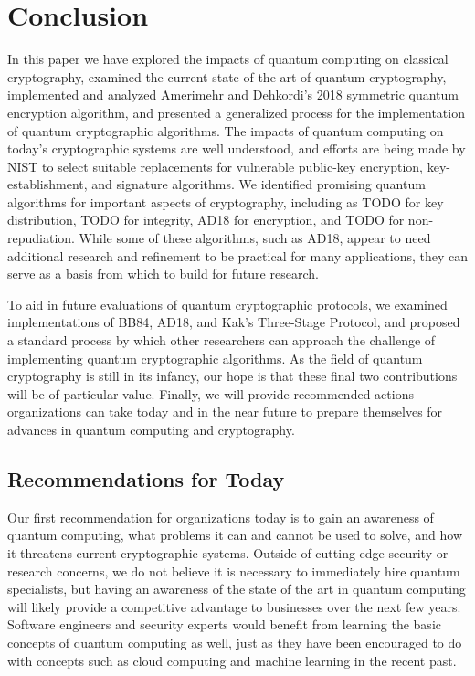 \documentclass[sigconf]{acmart}
\begin{document}
\section{Conclusion}
In this paper we have explored the impacts of quantum computing on classical cryptography, examined the current state of the art of quantum cryptography, implemented and analyzed Amerimehr and Dehkordi's 2018 symmetric quantum encryption algorithm\cite{amerimehr_quantum_2018}, and presented a generalized process for the implementation of quantum cryptographic algorithms. The impacts of quantum computing on today's cryptographic systems are well understood, and efforts are being made by NIST to select suitable replacements for vulnerable public-key encryption, key-establishment, and signature algorithms\cite{moody_nist_2020, csd_postquantum_2017}. We identified promising quantum algorithms for important aspects of cryptography, including as TODO for key distribution, TODO for integrity, AD18 for encryption, and TODO for non-repudiation. While some of these algorithms, such as AD18, appear to need additional research and refinement to be practical for many applications, they can serve as a basis from which to build for future research.

To aid in future evaluations of quantum cryptographic protocols, we examined implementations of BB84, AD18, and Kak's Three-Stage Protocol, and proposed a standard process by which other researchers can approach the challenge of implementing quantum cryptographic algorithms. As the field of quantum cryptography is still in its infancy, our hope is that these final two contributions will be of particular value. Finally, we will provide recommended actions organizations can take today and in the near future to prepare themselves for advances in quantum computing and cryptography.

\subsection{Recommendations for Today}
Our first recommendation for organizations today is to gain an awareness of quantum computing, what problems it can and cannot be used to solve, and how it threatens current cryptographic systems. Outside of cutting edge security or research concerns, we do not believe it is necessary to immediately hire quantum specialists, but having an awareness of the state of the art in quantum computing will likely provide a competitive advantage to businesses over the next few years. Software engineers and security experts would benefit from learning the basic concepts of quantum computing as well, just as they have been encouraged to do with concepts such as cloud computing and machine learning in the recent past.
\end{document}
